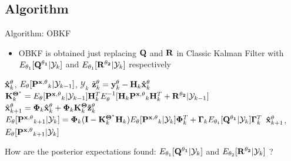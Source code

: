 \subsection{Algorithm}
\begin{frame}{Algorithm: OBKF}
\begin{itemize}
    \item OBKF is obtained just replacing ${\bf Q}$ and ${\bf R}$ in Classic Kalman Filter with $E_{\theta_1}[{\bf Q^{\theta_1}}|\mathcal{Y}_k]$ and $E_{\theta_1}[{\bf R^{\theta_2}}|\mathcal{Y}_k]$ respectively
\end{itemize}
\begin{algorithm}[H]
\caption{OBKF}
\begin{algorithmic}[1]
\REQUIRE ${\bf \hat x}^{\theta}_k$, $E_\theta[{\bf P^{x, \theta}}_{k}|\mathcal{Y}_{k-1}]$, $\mathcal{Y}_k$
\STATE $\tilde {\bf z}^{\bf \theta}_k = {\bf y}^{\bf \theta}_k - {\bf H}_k{\bf \hat x}^{\bf \theta}_k$
\STATE ${\bf K}^{\bf \Theta^*}_k = E_\theta[{\bf P^{x, \theta}}_k|\mathcal{Y}_{k-1}]{\bf H}^T_kE_\theta^{-1}[{\bf H}_k{\bf P^{x, \theta}}_k{\bf H}^T_k+{\bf R^{\theta_2}}|\mathcal{Y}_{k-1}]$
\STATE $\hat{\bf x}^{\theta}_{k+1} = {\bf \Phi}_k{\bf \hat x}^{\theta}_k+{\bf \Phi}_k{\bf K}^{\bf \Theta}_k{\bf \tilde z}^{\theta}_k$
\STATE $E_\theta[{\bf P^{x, \theta}}_{k+1}|\mathcal{Y}_k] = {\bf \Phi}_k({\bf I}-{\bf K}^{\bf \Theta^*}_k{\bf H}_k)E_\theta[{\bf P^{x, \theta}}_k|\mathcal{Y}_k]{\bf \Phi}^T_k + {\bf \Gamma}_kE_{\theta_1}[{\bf Q^{\theta_1}}|\mathcal{Y}_k]{\bf \Gamma}_k^T$
\ENSURE ${\bf \hat x}^{\theta}_{k+1}$, $E_\theta[{\bf P^{x, \theta}}_{k+1}|\mathcal{Y}_{k}]$
\end{algorithmic}
\end{algorithm}

\pause

How are the posterior expectations found: $E_{\theta_1}[{\bf Q^{\theta_1}}|\mathcal{Y}_k]$ and $E_{\theta_2}[{\bf R^{\theta_2}}|\mathcal{Y}_k]$ ?

\end{frame}

